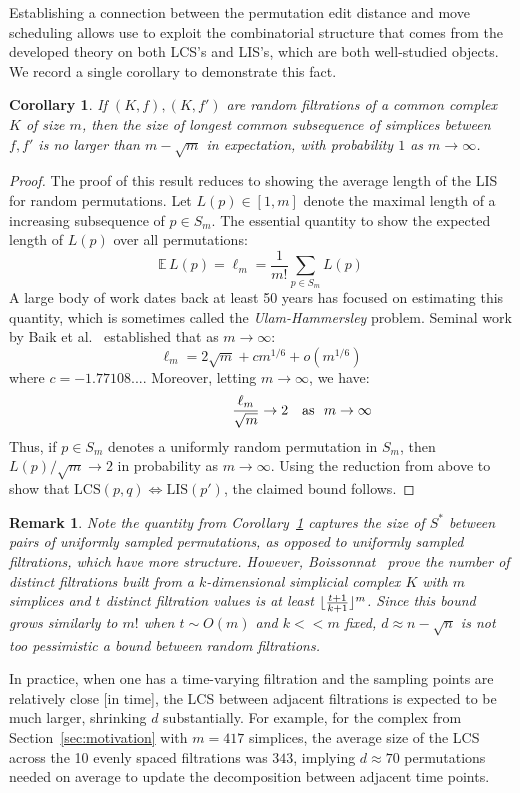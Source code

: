 \documentclass[sn-mathphys]{sn-jnl}
\newtheorem{corollary}{Corollary}
\newtheorem{remark}{Remark}
\DeclarePairedDelimiter\floor{\lfloor}{\rfloor}
\begin{document}
\noindent
Establishing a connection between the permutation edit distance and move scheduling allows use to exploit the combinatorial structure that comes from the developed theory on both LCS's and LIS's, which are both well-studied objects. We record a single corollary to demonstrate this fact. 
\begin{corollary}\label{cor:expectation}
If $(K, f), (K,f')$ are random filtrations of a common complex $K$ of size $m$, then the size of longest common subsequence of simplices between $f,f'$ is no larger than $m - \sqrt{m}$ in expectation, with probability $1$ as $m \to \infty$.
\end{corollary}
\begin{proof} \normalsize
	The proof of this result reduces to showing the average length of the LIS for random permutations. Let $L(p) \in [1,m]$ denote the maximal length of a increasing subsequence of $p \in S_m$. 
	The essential quantity to show the expected length of $L(p)$ over all permutations: 
	$$ \mathbb{E} \, L(p) = \ell_m = \frac{1}{m!} \sum\limits_{p \in S_m} L(p)$$
	A large body of work dates back at least 50 years has focused on estimating this quantity, which is sometimes called the \emph{Ulam-Hammersley} problem. Seminal work by Baik et al.~\cite{baik1999distribution} established that as $m \to \infty$:
	$$ \displaystyle \ell_m = 2 \sqrt{m} + c m^{1/6} + o(m^{1/6}) $$
where $c = -1.77108...$. Moreover, letting $m \to \infty$, we have: 
$$ \frac{\ell_m}{\sqrt{m}} \to 2\rlap{\quad \text{as } $m \to \infty$} $$	 
Thus, if $p \in S_m$ denotes a uniformly random permutation in $S_m$, then $L(p)/\sqrt{m} \to 2$ in probability as $m \to \infty$. Using the reduction from above to show that $\mathrm{LCS}(p,q) \Leftrightarrow \mathrm{LIS}(p')$, the claimed bound follows.
\end{proof}
\begin{remark}
\noindent Note the quantity from Corollary~\ref{cor:expectation} captures the size of $S^\ast$ between pairs of uniformly sampled permutations, as opposed to uniformly sampled filtrations, which have more structure. 
However, Boissonnat~\cite{boissonnat2018efficient} prove the number of distinct filtrations built from a $k$-dimensional simplicial complex $K$ with $m$ simplices and $t$ distinct filtration values is \emph{at least} $\floor{\frac{t+1}{k+1}}^m$. 
Since this bound grows similarly to $m!$ when $t \sim O(m)$ and $k << m$ fixed, $d \approx n - \sqrt{n}$ is not too pessimistic a bound between random filtrations.     
\end{remark}
\noindent 
In practice, when one has a time-varying filtration and the sampling points are relatively close [in time], the LCS between adjacent filtrations is expected to be much larger, shrinking $d$ substantially. 
For example, for the complex from Section~\ref{sec:motivation} with $m=417$ simplices, the average size of the LCS across the 10 evenly spaced filtrations was $343$, implying $d \approx 70$ permutations needed on average to update the decomposition between adjacent time points.
 
\end{document}
